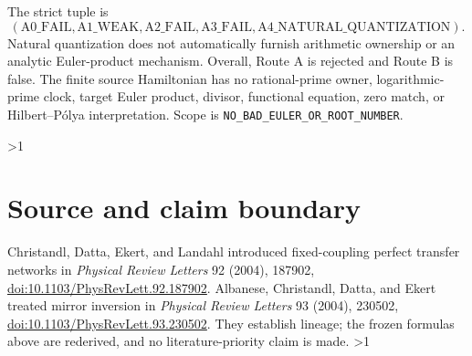 \documentclass[10pt]{article}
\providecommand{\CRevisionRound}{2}
\begin{document}
The strict tuple is
\[
(\mathrm{A0\_FAIL},\mathrm{A1\_WEAK},\mathrm{A2\_FAIL},
\mathrm{A3\_FAIL},\mathrm{A4\_NATURAL\_QUANTIZATION}).
\]
Natural quantization does not automatically furnish arithmetic ownership or
an analytic Euler-product mechanism.
Overall, Route A is rejected and Route B is false.  The finite source
Hamiltonian has no rational-prime owner, logarithmic-prime clock, target
Euler product, divisor, functional equation, zero match, or Hilbert--P\'olya
interpretation.  Scope is \texttt{NO\_BAD\_EULER\_OR\_ROOT\_NUMBER}.
\fi

\ifnum\CRevisionRound>1
\enlargethispage{3\baselineskip}
\fi
\section*{Source and claim boundary}
Christandl, Datta, Ekert, and Landahl introduced fixed-coupling perfect
transfer networks in \emph{Physical Review Letters} 92 (2004), 187902,
\href{https://doi.org/10.1103/PhysRevLett.92.187902}{doi:10.1103/PhysRevLett.92.187902}.
Albanese, Christandl, Datta, and Ekert treated mirror inversion in
\emph{Physical Review Letters} 93 (2004), 230502,
\href{https://doi.org/10.1103/PhysRevLett.93.230502}{doi:10.1103/PhysRevLett.93.230502}.
They establish lineage; the frozen formulas above are rederived, and no
literature-priority claim is made.
\ifnum\CRevisionRound>1
\normalsize
\fi
\end{document}
